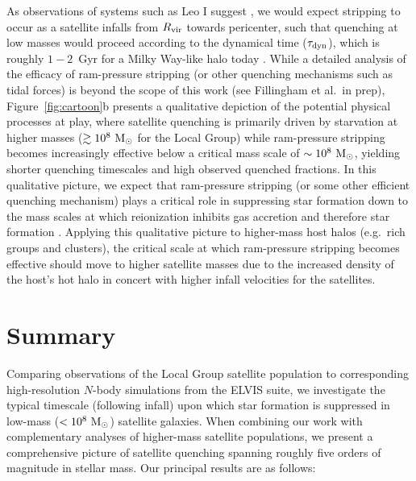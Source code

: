 \documentclass[usenatbib]{mn2e}
\newcommand{\mstar}{{\rm M}_{\star}}
\newcommand{\msun}{{\rm M}_{\odot}}
\begin{document}
As observations of systems such as Leo I suggest \citep{sohn13}, we
would expect stripping to occur as a satellite infalls from $R_{\rm
  vir}$ towards pericenter, such that quenching at low masses would
proceed according to the dynamical time ($\tau_{\rm dyn}$), which is
roughly $1-2$~Gyr for a Milky Way-like halo today
\citep[e.g.][]{stewart09}.
%
While a detailed analysis of the efficacy of ram-pressure stripping
(or other quenching mechanisms such as tidal forces) is beyond the
scope of this work (see Fillingham et al.~in prep),
Figure~\ref{fig:cartoon}b presents a qualitative depiction of the
potential physical processes at play, where satellite quenching is
primarily driven by starvation at higher masses ($\gtrsim
10^{8}~\msun$ for the Local Group) while ram-pressure stripping
becomes increasingly effective below a critical mass scale of $\sim
10^{8}~\msun$, yielding shorter quenching timescales and high observed
quenched fractions. In this qualitative picture, we expect that
ram-pressure stripping (or some other efficient quenching mechanism)
plays a critical role in suppressing star formation down to the mass
scales at which reionization inhibits gas accretion and therefore star
formation \citep[perhaps, $\mstar \sim 10^{4}~\msun$,][]{brown14,
  onorbe15, wheeler15}. Applying this qualitative picture to
higher-mass host halos (e.g.~rich groups and clusters), the critical
scale at which ram-pressure stripping becomes effective should move to
higher satellite masses due to the increased density of the host's hot
halo in concert with higher infall velocities for the satellites.




\section{Summary}
\label{sec:summary}

Comparing observations of the Local Group satellite population to
corresponding high-resolution $N$-body simulations from the ELVIS
suite, we investigate the typical timescale (following infall) upon
which star formation is suppressed in low-mass ($<10^{8}~\msun$)
satellite galaxies. When combining our work with complementary
analyses of higher-mass satellite populations, we present a
comprehensive picture of satellite quenching spanning roughly five
orders of magnitude in stellar mass. Our principal results are as
follows:
\end{document}
